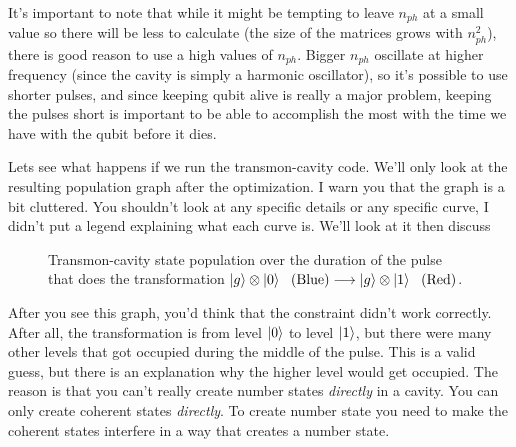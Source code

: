 It's important to note that while it might be tempting to leave $n_{ph}$ at a small value so there will be less to calculate (the size of the matrices grows with $n_{ph}^2$), there is good reason to use a high values of $n_{ph}$. Bigger $n_{ph}$ oscillate at higher frequency (since the cavity is simply a harmonic oscillator), so it's possible to use shorter pulses, and since keeping qubit alive is really a major problem, keeping the pulses short is important to be able to accomplish the most with the time we have with the qubit before it dies.

Lets see what happens if we run the transmon-cavity code. We'll only look at the resulting population graph after the optimization. I warn you that the graph is a bit cluttered. You shouldn't look at any specific details or any specific curve, I didn't put a legend explaining what each curve is. We'll look at it then discuss
\begin{figure}[H]
    \begin{center}
        
    \end{center}
    \caption{Transmon-cavity state population over the duration of the pulse that does the transformation $\ket{g} \otimes \ket{0}\ \text{ (Blue)} \longrightarrow \ket{g} \otimes \ket{1}\ \text{ (Red)}$.}
    \label{fig:transmon-cavity-population}
\end{figure}
After you see this graph, you'd think that the constraint didn't work correctly. After all, the transformation is from level $\ket{0}$ to level $\ket{1}$, but there were many other levels that got occupied during the middle of the pulse. This is a valid guess, but there is an explanation why the higher level would get occupied. The reason is that you can't really create number states \textit{directly} in a cavity. You can only create coherent states \textit{directly}. To create  number state you need to make the coherent states interfere in a way that creates a number state.

